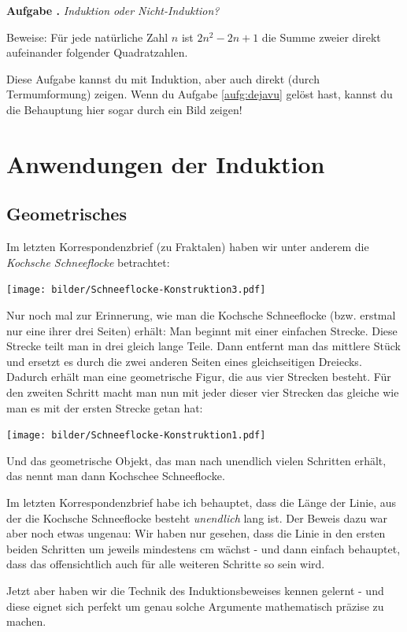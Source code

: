 \documentclass[a4paper,ngerman,12pt]{scrartcl}
\theoremstyle{definition}
\theoremstyle{plain}
\theoremstyle{remark}
\newlength{\aufgabenskip}
\newcounter{aufgabennummer}
\newenvironment{aufgabe}[1]{
	\addtocounter{aufgabennummer}{1}
	\textbf{Aufgabe \theaufgabennummer.} \emph{#1} \par
}{\vspace{\aufgabenskip}}
\begin{document}
\begin{aufgabe}{Induktion oder Nicht-Induktion?}
	Beweise: Für jede natürliche Zahl $n$ ist $2n^2-2n+1$ die Summe zweier direkt aufeinander folgender Quadratzahlen.
	
	Diese Aufgabe kannst du mit Induktion, aber auch direkt (durch Termumformung) zeigen. Wenn du Aufgabe \ref{aufg:dejavu} gelöst hast, kannst du die Behauptung hier sogar durch ein Bild zeigen!
\end{aufgabe}


\section{Anwendungen der Induktion}

\subsection{Geometrisches}

Im letzten Korrespondenzbrief (zu Fraktalen) haben wir unter anderem die \emph{Kochsche Schneeflocke} betrachtet:
\begin{center}
	\texttt{[image: bilder/Schneeflocke-Konstruktion3.pdf]}
\end{center}
Nur noch mal zur Erinnerung, wie man die Kochsche Schneeflocke (bzw. erstmal nur eine ihrer drei Seiten) erhält: Man beginnt mit einer einfachen Strecke. Diese Strecke teilt man in drei gleich lange Teile. Dann entfernt man das mittlere Stück und ersetzt es durch die zwei anderen Seiten eines gleichseitigen Dreiecks. Dadurch erhält man eine geometrische Figur, die aus vier Strecken besteht. Für den zweiten Schritt macht man nun mit jeder dieser vier Strecken das gleiche wie man es mit der ersten Strecke getan hat:
\begin{center}
	\texttt{[image: bilder/Schneeflocke-Konstruktion1.pdf]}
\end{center}
Und das geometrische Objekt, das man \glqq nach unendlich vielen Schritten\grqq{} erhält, das nennt man dann Kochschee Schneeflocke.

Im letzten Korrespondenzbrief habe ich behauptet, dass die Länge der Linie, aus der die Kochsche Schneeflocke besteht \emph{unendlich} lang ist. Der Beweis dazu war aber noch etwas ungenau: Wir haben nur gesehen, dass die Linie in den ersten beiden Schritten um jeweils mindestens \unit[1]{cm} wächst - und dann einfach behauptet, dass das \glqq offensichtlich\grqq{} auch für alle weiteren Schritte so sein wird.

Jetzt aber haben wir die Technik des Induktionsbeweises kennen gelernt - und diese eignet sich perfekt um genau solche Argumente mathematisch präzise zu machen. 
\end{document}
